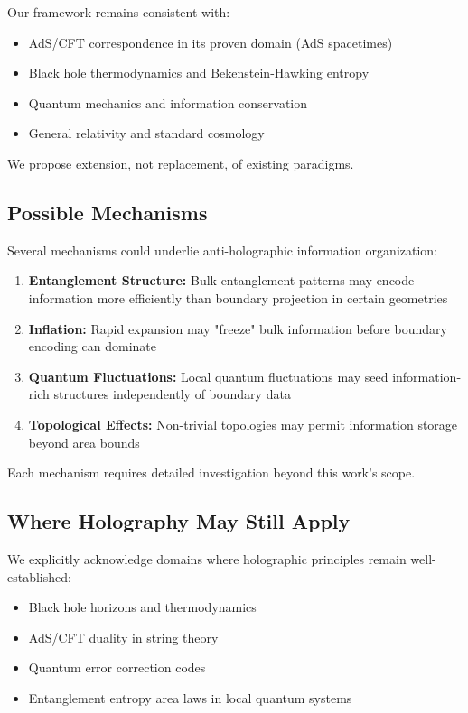 \documentclass[twocolumn,aps,prd,superscriptaddress,nofootinbib]{revtex4-2}
\begin{document}
Our framework remains consistent with:
\begin{itemize}
    \item AdS/CFT correspondence in its proven domain (AdS spacetimes)
    \item Black hole thermodynamics and Bekenstein-Hawking entropy
    \item Quantum mechanics and information conservation
    \item General relativity and standard cosmology
\end{itemize}

We propose extension, not replacement, of existing paradigms.

\subsection{Possible Mechanisms}

Several mechanisms could underlie anti-holographic information organization:

\begin{enumerate}
    \item \textbf{Entanglement Structure:} Bulk entanglement patterns may encode information more efficiently than boundary projection in certain geometries
    
    \item \textbf{Inflation:} Rapid expansion may "freeze" bulk information before boundary encoding can dominate
    
    \item \textbf{Quantum Fluctuations:} Local quantum fluctuations may seed information-rich structures independently of boundary data
    
    \item \textbf{Topological Effects:} Non-trivial topologies may permit information storage beyond area bounds
\end{enumerate}

Each mechanism requires detailed investigation beyond this work's scope.

\subsection{Where Holography May Still Apply}

We explicitly acknowledge domains where holographic principles remain well-established:

\begin{itemize}
    \item Black hole horizons and thermodynamics
    \item AdS/CFT duality in string theory
    \item Quantum error correction codes
    \item Entanglement entropy area laws in local quantum systems
\end{itemize}
\end{document}
